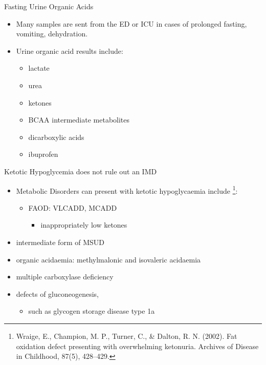 \documentclass[presentation, smaller]{beamer}
\begin{document}
\begin{frame}[label={sec:orgheadline2}]{Fasting Urine Organic Acids}
\begin{itemize}
\item Many samples are sent from the ED or ICU in cases of prolonged
fasting, vomiting, dehydration.

\item Urine organic acid results include:
\begin{itemize}
\item lactate
\item urea
\item ketones
\item BCAA intermediate metabolites
\item dicarboxylic acids
\item ibuprofen
\end{itemize}
\end{itemize}
\end{frame}

\begin{frame}[label={sec:orgheadline3}]{Ketotic Hypoglycemia does not rule out an IMD}
\begin{itemize}
\item Metabolic Disorders can present with ketotic hypoglycaemia include \footnote{Wraige, E., Champion, M. P., Turner, C., \& Dalton,
R. N. (2002). Fat oxidation defect presenting with overwhelming
ketonuria. Archives of Disease in Childhood, 87(5), 428–429.}:
\begin{itemize}
\item FAOD: VLCADD, MCADD 
\begin{itemize}
\item inappropriately low ketones
\end{itemize}
\end{itemize}
\item intermediate form of MSUD
\item organic acidaemia: methylmalonic and isovaleric acidaemia
\item multiple carboxylase deficiency
\item defects of gluconeogenesis,
\begin{itemize}
\item such as glycogen storage disease type 1a
\end{itemize}
\end{itemize}
\end{frame}
\end{document}
